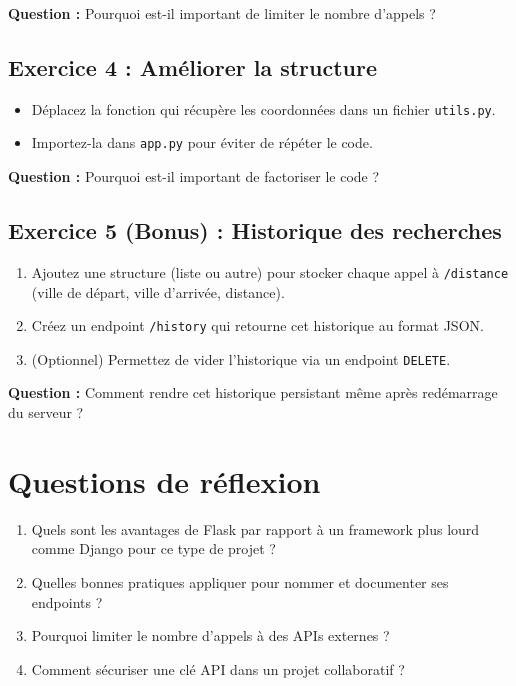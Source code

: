 \documentclass[a4paper,12pt]{article}
\begin{document}
\textbf{Question :} Pourquoi est-il important de limiter le nombre d’appels ?

\subsection*{Exercice 4 : Améliorer la structure}

\begin{itemize}
    \item Déplacez la fonction qui récupère les coordonnées dans un fichier \texttt{utils.py}.
    \item Importez-la dans \texttt{app.py} pour éviter de répéter le code.
\end{itemize}

\textbf{Question :} Pourquoi est-il important de factoriser le code ?

\subsection*{Exercice 5 (Bonus) : Historique des recherches}

\begin{enumerate}
    \item Ajoutez une structure (liste ou autre) pour stocker chaque appel à \texttt{/distance} (ville de départ, ville d’arrivée, distance).
    \item Créez un endpoint \texttt{/history} qui retourne cet historique au format JSON.
    \item (Optionnel) Permettez de vider l’historique via un endpoint \texttt{DELETE}.
\end{enumerate}

\textbf{Question :} Comment rendre cet historique persistant même après redémarrage du serveur ?

\section*{Questions de réflexion}

\begin{enumerate}
    \item Quels sont les avantages de Flask par rapport à un framework plus lourd comme Django pour ce type de projet ?
    \item Quelles bonnes pratiques appliquer pour nommer et documenter ses endpoints ?
    \item Pourquoi limiter le nombre d’appels à des APIs externes ?
    \item Comment sécuriser une clé API dans un projet collaboratif ?
\end{enumerate}
\end{document}
